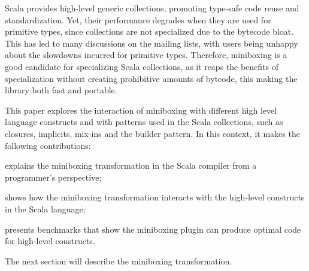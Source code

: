 Scala provides high-level generic collections, promoting type-safe code reuse and standardization. Yet, their performance degrades when they are used for primitive types, since collections are not specialized due to the bytecode bloat. This has led to many discussions on the mailing lists, with users being unhappy about the slowdowns incurred for primitive types. Therefore, miniboxing is a good candidate for specializing Scala collections, as it reaps the benefits of specialization without creating prohibitive amounts of bytcode, this making the library both fast and portable.

This paper explores the interaction of miniboxing with different high level language constructs and with patterns used in the Scala collections, such as closures, implicits, mix-ins and the builder pattern. In this context, it makes the following contributions:

\begin{packed_item}
\item explains the miniboxing transformation in the Scala compiler from a programmer's perspective;
\item shows how the miniboxing transformation interacts with the high-level constructs in the Scala language;
\item presents benchmarks that show the miniboxing plugin can produce optimal code for high-level constructs.
\end{packed_item}

The next section will describe the miniboxing transformation.